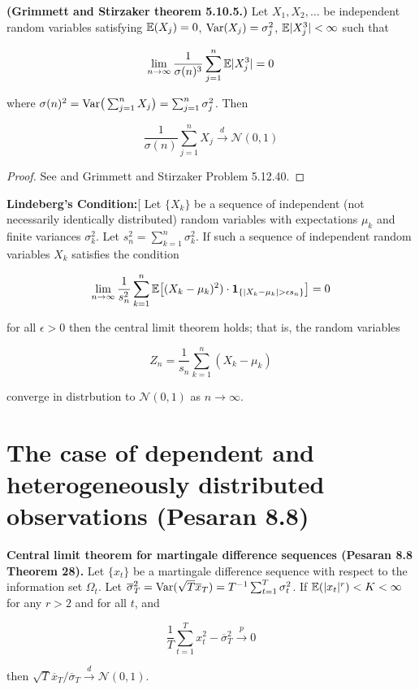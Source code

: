 \begin{theorem}\textbf{(Grimmett and Stirzaker theorem 5.10.5.)} Let \(X_1, X_2, \ldots\) be independent random variables satisfying \(\mathbb{E}(X_j) = 0\), \(\mathrm{Var}(X_j) = \sigma_j^2\), \(\mathbb{E}|X_j^3| < \infty\) such that

\[
\lim_{n \to \infty} \frac{1}{\sigma(n)^3} \sum_{j=1}^n \mathbb{E}|X_j^3| = 0
\]

where \(\sigma(n)^2 = \mathrm{Var}\big( \sum_{j=1}^n X_j \big) = \sum_{j=1}^n \sigma_j^2\). Then 

\[
\frac{1}{\sigma(n)} \sum_{j=1}^n X_j \xrightarrow{d} \mathcal{N}(0,1)
\]
\end{theorem}
\begin{proof}See \citet[p. 287]{loeve1977probability} and Grimmett and Stirzaker Problem 5.12.40.\end{proof}

\begin{lemma}\textbf{Lindeberg's Condition:}[\label{asym.lindeberg.cond} Let \(\{X_k\}\) be a sequence of independent (not necessarily identically distributed) random variables with expectations \(\mu_k\) and finite variances \(\sigma_k^2\). Let \(s_n^2 = \sum_{k=1}^n \sigma_k^2\). If such a sequence of independent random variables \(X_k\) satisfies the condition

\[
\lim_{n \to \infty} \frac{1}{s_n^2} \sum_{k=1}^n \mathbb{E} \big[(X_k - \mu_k)^2) \cdot \boldsymbol{1}_{\{|X_k - \mu_k| > \epsilon s_n\}} \big] = 0
\]

for all \(\epsilon > 0\) then the central limit theorem holds; that is, the random variables

\[
Z_n = \frac{1}{s_n} \sum_{k=1}^n(X_k - \mu_k)
\]

converge in distrbution to \(\mathcal{N}(0, 1)\) as \(n \to \infty\).
\end{lemma}

\section{The case of dependent and heterogeneously distributed observations (Pesaran 8.8)}


\begin{theorem}\label{asym.clt.mart.ds} \textbf{Central limit theorem for martingale difference sequences (Pesaran 8.8 Theorem 28).} Let \(\{x_t\}\) be a martingale difference sequence with respect to the information set \(\Omega_t\). Let \(\overline{\sigma}_T^2 = \mathrm{Var}( \sqrt{T} \overline{x}_T) = T^{-1} \sum_{t=1}^T \sigma_t^2\). If \(\mathbb{E}(|x_t|^r) < K < \infty\) for any \(r > 2\) and for all \(t\), and

\[
\frac{1}{T} \sum_{t=1}^T x_t^2 - \overline{\sigma}_T^2 \xrightarrow{p} 0
\]

then \(\sqrt{T} \overline{x}_T / \overline{\sigma}_T \xrightarrow{d} \mathcal{N}(0, 1)\).
\end{theorem}

